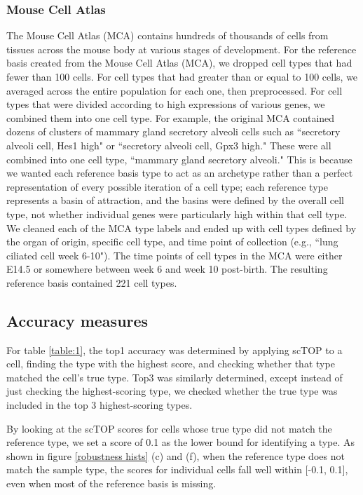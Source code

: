 \documentclass[aps,superscriptaddress, notitlepage,longbibliography]{revtex4-1}
\begin{document}
\subsubsection{Mouse Cell Atlas}
The Mouse Cell Atlas (MCA) contains hundreds of thousands of cells from tissues across the mouse body at various stages of development. For the reference basis created from the Mouse Cell Atlas (MCA), we dropped cell types that had fewer than 100 cells. For cell types that had greater than or equal to 100 cells, we averaged across the entire population for each one, then preprocessed. For cell types that were divided according to high expressions of various genes, we combined them into one cell type. For example, the original MCA contained dozens of clusters of mammary gland secretory alveoli cells such as ``secretory alveoli cell, Hes1 high" or ``secretory alveoli cell, Gpx3 high." These were all combined into one cell type, ``mammary gland secretory alveoli." This is because we wanted each reference basis type to act as an archetype rather than a perfect representation of every possible iteration of a cell type; each reference type represents a basin of attraction, and the basins were defined by the overall cell type, not whether individual genes were particularly high within that cell type. We cleaned each of the MCA type labels and ended up with cell types defined by the organ of origin, specific cell type, and time point of collection (e.g., ``lung ciliated cell week 6-10"). The time points of cell types in the MCA were either E14.5 or somewhere between week 6 and week 10 post-birth.   The resulting reference basis contained 221 cell types.

\subsection{Accuracy measures}
For table \ref{table:1}, the top1 accuracy was determined by applying scTOP to a cell, finding the type with the highest score, and checking whether that type matched the cell's true type. Top3 was similarly determined, except instead of just checking the highest-scoring type, we checked whether the true type was included in the top 3 highest-scoring types.

By looking at the scTOP scores for cells whose true type did not match the reference type, we set a score of 0.1 as the lower bound for identifying a type. As shown in figure \ref{robustness hists} (c) and (f), when the reference type does not match the sample type, the scores for individual cells fall well within [-0.1, 0.1], even when most of the reference basis is missing.
\end{document}
